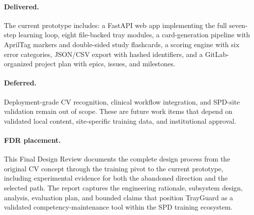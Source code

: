\documentclass[10pt]{article}
\begin{document}
\paragraph{Delivered.}
The current prototype includes: a FastAPI web app implementing the full
seven-step learning loop, eight file-backed tray modules, a card-generation
pipeline with AprilTag markers and double-sided study flashcards, a scoring
engine with six error categories, JSON/CSV export with hashed identifiers, and
a GitLab-organized project plan with epics, issues, and milestones.

\paragraph{Deferred.}
Deployment-grade CV recognition, clinical workflow integration, and SPD-site
validation remain out of scope. These are future work items that depend on
validated local content, site-specific training data, and institutional
approval.

\paragraph{FDR placement.}
This Final Design Review documents the complete design process from the
original CV concept through the training pivot to the current prototype,
including experimental evidence for both the abandoned direction and the
selected path. The report captures the engineering rationale, subsystem design,
analysis, evaluation plan, and bounded claims that position TrayGuard as a
validated competency-maintenance tool within the SPD training ecosystem.
\end{document}
